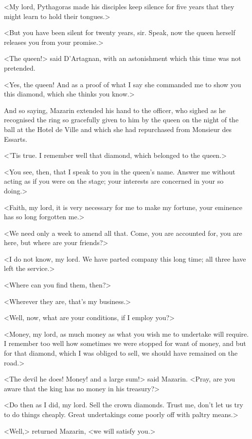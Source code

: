 <My lord, Pythagoras made his disciples keep silence for five years that they might learn to hold their tongues.>

<But you have been silent for twenty years, sir. Speak, now the queen herself releases you from your promise.>

<The queen!> said D'Artagnan, with an astonishment which this time was not pretended.

<Yes, the queen! And as a proof of what I say she commanded me to show you this diamond, which she thinks you know.>

And so saying, Mazarin extended his hand to the officer, who sighed as he recognised the ring so gracefully given to him by the queen on the night of the ball at the Hotel de Ville and which she had repurchased from Monsieur des Essarts.

<'Tis true. I remember well that diamond, which belonged to the queen.>

<You see, then, that I speak to you in the queen's name. Answer me without acting as if you were on the stage; your interests are concerned in your so doing.>

<Faith, my lord, it is very necessary for me to make my fortune, your eminence has so long forgotten me.>

<We need only a week to amend all that. Come, you are accounted for, you are here, but where are your friends?>

<I do not know, my lord. We have parted company this long time; all three have left the service.>

<Where can you find them, then?>

<Wherever they are, that's my business.>

<Well, now, what are your conditions, if I employ you?>

<Money, my lord, as much money as what you wish me to undertake will require. I remember too well how sometimes we were stopped for want of money, and but for that diamond, which I was obliged to sell, we should have remained on the road.>

<The devil he does! Money! and a large sum!> said Mazarin. <Pray, are you aware that the king has no money in his treasury?>

<Do then as I did, my lord. Sell the crown diamonds. Trust me, don't let us try to do things cheaply. Great undertakings come poorly off with paltry means.>

<Well,> returned Mazarin, <we will satisfy you.>

